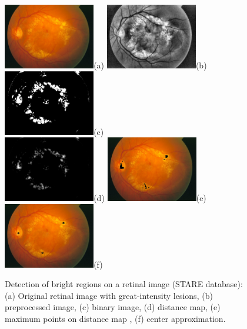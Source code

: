 \begin{figure}[t]
	\centering
	\includegraphics[width=4.0cm]{Images/Methode/Detection/im0002/im0002_.jpg}{(a)}
	\includegraphics[width=4.0cm]{Images/Methode/Detection/im0002/1_image_egalisee.jpg}{(b)}
	\includegraphics[width=4.0cm]{Images/Methode/Detection/im0002/2_image_seuillee.jpg}{(c)}\\
	\includegraphics[width=4.0cm]{Images/Methode/Detection/im0002/3_image_dist.jpg}{(d)}
	\includegraphics[width=4.0cm]{Images/Methode/Detection/im0002/4_image_points2.jpg}{(e)}
	\includegraphics[width=4.0cm]{Images/Methode/Detection/im0002/points.jpg}{(f)}
	\caption{\label{images_detect}Detection of bright regions on a retinal image (STARE database): (a) Original retinal image with great-intensity lesions, (b) preprocessed image, (c) binary image, (d) distance map, (e) maximum points on distance map , (f) center approximation.}
\end{figure}


